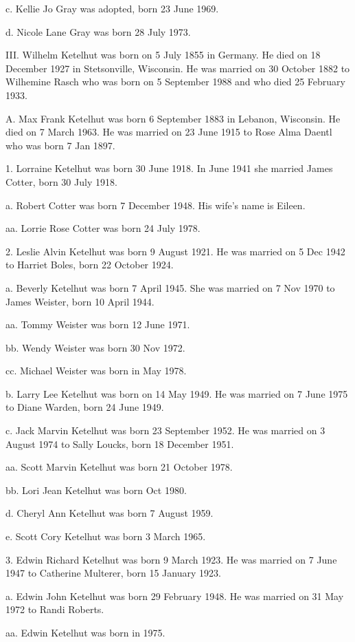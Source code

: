 \documentclass[a4paper]{article}
\begin{document}
c. Kellie Jo Gray was adopted, born 23 June 1969.

d. Nicole Lane Gray was born 28 July 1973.

III. Wilhelm Ketelhut was born on 5 July 1855 in Germany.  He died on 18 December 1927 in Stetsonville, Wisconsin.  He was married on 30 October 1882 to Wilhemine Rasch who was born on 5 September 1988 and who died 25 February 1933.   

A. Max Frank Ketelhut was born 6 September 1883 in Lebanon, Wisconsin.  He died on 7 March 1963.  He was married on 23 June 1915 to Rose Alma Daentl who was born 7 Jan 1897.  

1. Lorraine Ketelhut was born 30 June 1918.  In June 1941 she married James Cotter, born 30 July 1918.  

a. Robert  Cotter was born 7 December 1948.  His wife's name is Eileen.

aa. Lorrie Rose Cotter was born 24 July 1978.

2. Leslie Alvin Ketelhut was born 9 August 1921.  He was married on 5 Dec 1942 to Harriet Boles, born 22 October 1924.

a. Beverly Ketelhut was born 7 April 1945.  She was married on 7 Nov 1970 to James Weister, born 10 April 1944.

aa. Tommy Weister was born 12 June 1971.

bb. Wendy Weister was born 30 Nov 1972.

cc.  Michael Weister was born in May 1978.

b. Larry Lee Ketelhut was born on 14 May 1949.  He was married on 7 June 1975 to Diane Warden, born 24 June 1949.

c. Jack Marvin Ketelhut was born 23 September 1952.  He was married on 3 August 1974 to Sally Loucks, born 18 December 1951.

aa. Scott Marvin Ketelhut was born 21 October 1978.

bb. Lori  Jean Ketelhut was born Oct 1980.

d. Cheryl Ann Ketelhut was born 7 August 1959.

e. Scott Cory Ketelhut was born 3 March 1965.

3. Edwin Richard Ketelhut was born 9 March 1923.  He was married on 7 June 1947 to Catherine Multerer, born 15 January 1923.

a. Edwin John Ketelhut was born 29 February 1948.  He was married on 31 May 1972 to Randi Roberts.

aa. Edwin Ketelhut was born in 1975.
\end{document}
